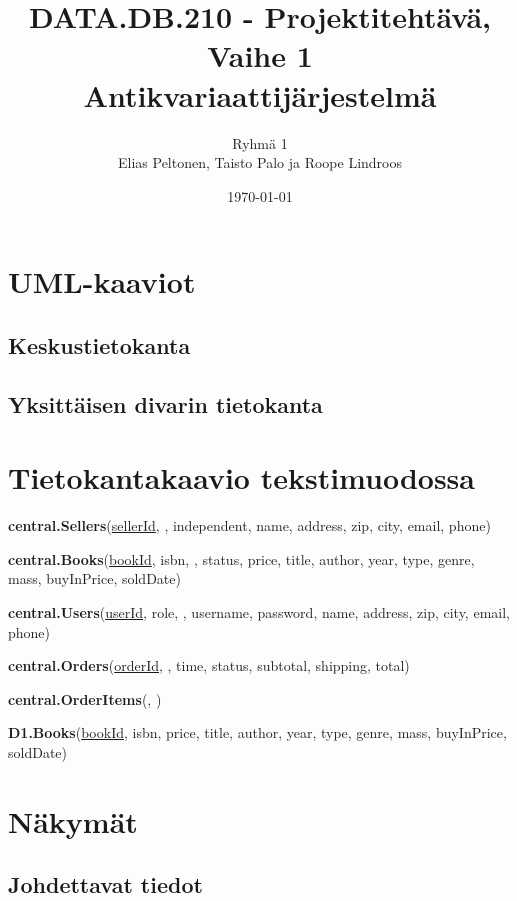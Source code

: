 \documentclass[11pt,a4paper]{article}
\title{DATA.DB.210 - Projektitehtävä, Vaihe 1 \\ \large Antikvariaattijärjestelmä}
\author{Ryhmä 1 \\ \small Elias Peltonen, Taisto Palo ja Roope Lindroos}
\date{\today}
\begin{document}
\maketitle
\newpage

\tableofcontents
\newpage

\section{UML-kaaviot}

\subsection{Keskustietokanta}



\subsection{Yksittäisen divarin tietokanta}



\section{Tietokantakaavio tekstimuodossa}

{\small{
	\textbf{central.Sellers}(\underline{sellerId}, , independent, name, address, zip, city, email, phone)
	
	\textbf{central.Books}(\underline{bookId}, isbn, , status, price, title, author, year, type, genre, mass, buyInPrice, soldDate)
	
	\textbf{central.Users}(\underline{userId}, role, , username, password, name, address, zip, city, email, phone)
	
	\textbf{central.Orders}(\underline{orderId}, , time, status, subtotal, shipping, total)
	
	\textbf{central.OrderItems}(, )
	
	\textbf{D1.Books}(\underline{bookId}, isbn, price, title, author, year, type, genre, mass, buyInPrice, soldDate)
}}


\section{Näkymät}

\subsection{Johdettavat tiedot}
\end{document}
